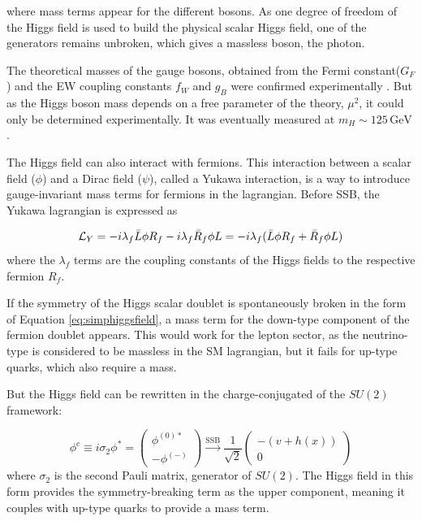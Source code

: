 where mass terms appear for the different bosons. As one degree of freedom of the Higgs field is used to build the physical scalar Higgs field, one of the generators remains unbroken, which gives a massless boson, the photon.

The theoretical masses of the gauge bosons, obtained from the Fermi constant($G_F$) and the EW coupling constants $f_W$ and $g_B$ were confirmed experimentally \cite{ARNISON1983103,BANNER1983476,1983398,BAGNAIA1983130,Group:2008ds}. But as the Higgs boson mass depends on a free parameter of the theory, $\mu^2$, it could only be determined experimentally. It was eventually measured at $m_H \sim 125\,{\mathrm{GeV}}$ \cite{Aad2016}.\newline

The Higgs field can also interact with fermions. This interaction between a scalar field ($\phi$) and a Dirac field ($\psi$), called a Yukawa interaction, is a way to introduce gauge-invariant mass terms for fermions in the lagrangian. Before SSB, the Yukawa lagrangian is expressed as 

\begin{equation}
    \mathcal{L}_{Y} = -i\lambda_f \Bar{L} \phi R_f - i\lambda_f\Bar{R}_f \phi L = -i\lambda_f (\Bar{L}\phi R_f + \Bar{R}_f \phi L)
\end{equation}
where the $\lambda_f$ terms are the coupling constants of the Higgs fields to the respective fermion $R_f$.

If the symmetry of the Higgs scalar doublet is spontaneously broken in the form of Equation \ref{eq:simphiggsfield}, a mass term for the down-type component of the fermion doublet appears. This would work for the lepton sector, as the neutrino-type is considered to be massless in the SM lagrangian, but it fails for up-type quarks, which also require a mass.

But the Higgs field can be rewritten in the charge-conjugated of the $SU(2)$ framework:

\begin{equation}
    \phi^c \equiv i\sigma_2 \phi^* = \begin{pmatrix} \phi^{(0)*} \\ -\phi^{(-)} \end{pmatrix}  \xrightarrow{\text{SSB}} \frac{1}{\sqrt{2}}\begin{pmatrix} -(v+h(x)) \\ 0 \end{pmatrix} 
\end{equation}
where $\sigma_2$ is the second Pauli matrix, generator of $SU(2)$. The Higgs field in this form provides the symmetry-breaking term as the upper component, meaning it couples with up-type quarks to provide a mass term.


